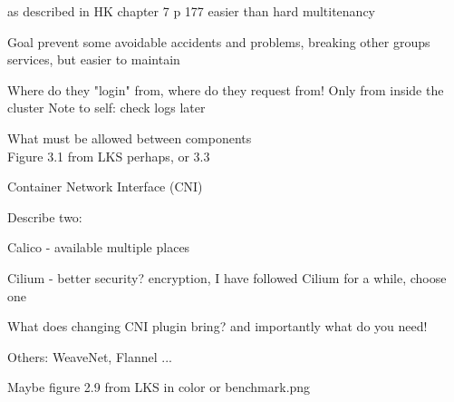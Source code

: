 \documentclass[Screen16to9,17pt]{foils}
\begin{document}

\begin{list2}
\item
\end{list2}
as described in HK chapter 7 p 177
easier than hard multitenancy

Goal prevent some avoidable accidents and problems, breaking other groups services, but easier to maintain



\begin{list2}
\item
\end{list2}
Where do they "login" from, where do they request from! Only from inside the cluster
Note to self: check logs later


\begin{list2}
\item What must be allowed between components\\
Figure 3.1 from LKS perhaps, or 3.3
\end{list2}

\begin{list2}
\item
Container Network Interface (CNI)
\end{list2}



Describe two:
\begin{list2}
\item Calico - available multiple places
\item Cilium - better security? encryption, I have followed Cilium for a while, choose one
\item What does changing CNI plugin bring? and importantly what do you need!
\end{list2}



\begin{list2}
\item {}

\item Others: WeaveNet, Flannel ...

\item Maybe figure 2.9 from LKS in color or benchmark.png
\end{list2}
\end{document}
